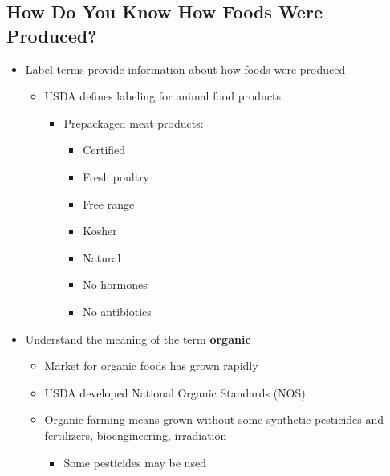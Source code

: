 \documentclass[12pt]{article}
\begin{document}
        \subsection{How Do You Know How Foods Were Produced?}
            \begin{itemize}
                \item Label terms provide information about how foods were produced
                    \begin{itemize}
                        \item USDA defines labeling for animal food products
                            \begin{itemize}
                                \item Prepackaged meat products:
                                    \begin{itemize}
                                        \item Certified
                                        \item Fresh poultry
                                        \item Free range
                                        \item Kosher
                                        \item Natural
                                        \item No hormones
                                        \item No antibiotics
                                    \end{itemize}
                            \end{itemize}
                    \end{itemize}
                \item Understand the meaning of the term \textbf{organic}
                    \begin{itemize}
                        \item Market for organic foods has grown rapidly
                        \item USDA developed National Organic Standards (NOS)
                        \item Organic farming means grown without some synthetic pesticides and fertilizers, bioengineering, irradiation
                            \begin{itemize}
                                \item Some pesticides may be used

\end{itemize}
\end{itemize}
\end{itemize}
\end{document}
